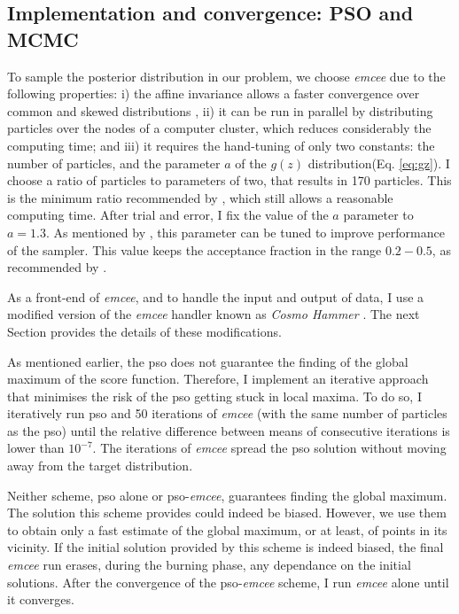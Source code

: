 \subsection{Implementation and convergence: PSO and MCMC}
To sample the posterior distribution in our problem, we choose \emph{emcee} due to the following properties: i) the affine invariance allows a faster convergence over common and skewed distributions \cite[see][for details]{Goodman2010,Foreman2013}, ii) it can be run in parallel by distributing particles over the nodes of a computer cluster, which reduces considerably the computing time; and iii) it requires the hand-tuning of only two constants: the number of particles, and the parameter $a$ of the $g(z)$ distribution(Eq. \ref{eq:gz}). I choose a ratio of particles to parameters of two, that results in 170 particles. This is the minimum ratio recommended by \citet{Foreman2013}, which still allows a reasonable computing time. After trial and error, I fix the value of the $a$ parameter to $a=1.3$. As mentioned by \citet{Goodman2010}, this parameter can be tuned to improve performance of the sampler. This value keeps the acceptance fraction in the range $0.2-0.5$, as recommended by \citet{Foreman2013}.

{As a front-end of \emph{emcee}, and to handle the input and output of data, I use a modified version of the \emph{emcee} handler known as \emph{Cosmo Hammer} \citep{Akeret2013}. The next Section provides the details of these modifications. }

As mentioned earlier, the \gls{pso} does not guarantee the finding of the global maximum of the score function. Therefore, I implement an iterative approach that minimises the risk of the \gls{pso} getting stuck in local maxima. To do so, I iteratively run \gls{pso} and 50 iterations of \emph{emcee} (with the same number of particles as the \gls{pso}) until the relative difference between means of consecutive iterations is lower than $10^{-7}$. The iterations of \emph{emcee} spread the \gls{pso} solution without moving away from the target distribution. 
 
Neither scheme, \gls{pso} alone or \gls{pso}-\emph{emcee}, guarantees finding the global maximum. The solution this scheme provides could indeed be biased. However, we use them to obtain only a fast estimate of the global maximum, or at least, of points in its vicinity. If the initial solution provided by this scheme is indeed biased, the final \emph{emcee} run erases, during the burning phase, any dependance on the initial solutions. After the convergence of the \gls{pso}-\emph{emcee} scheme, I run \emph{emcee} alone until it converges.  
 
